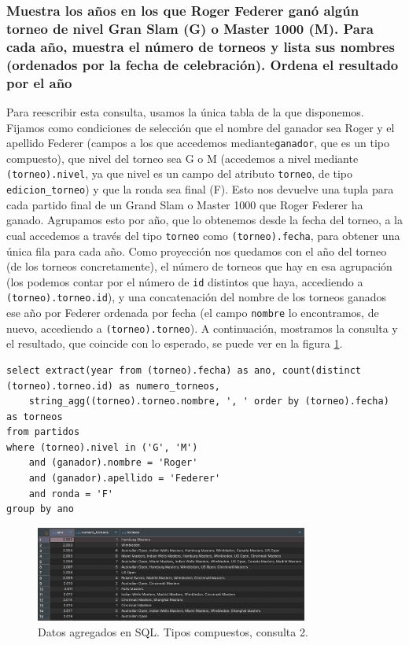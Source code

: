 \subsubsection{Muestra los años en los que Roger Federer ganó algún torneo de nivel Gran Slam (G) o Master 1000 (M). Para cada año, muestra el número de torneos y lista sus nombres (ordenados por la fecha de celebración). Ordena el resultado por el año}

Para reescribir esta consulta, usamos la única tabla de la que disponemos. Fijamos como condiciones de selección que el nombre del ganador sea Roger y el apellido Federer (campos a los que accedemos mediante\texttt{ganador}, que es un tipo compuesto), que nivel del torneo sea G o M (accedemos a nivel mediante \texttt{(torneo).nivel}, ya que nivel es un campo del atributo \texttt{torneo}, de tipo \texttt{edicion\_torneo}) y que la ronda sea final (F). Esto nos devuelve una tupla para cada partido final de un Grand Slam o Master 1000 que Roger Federer ha ganado. Agrupamos esto por año, que lo obtenemos desde la fecha del torneo, a la cual accedemos a través del tipo \texttt{torneo} como \texttt{(torneo).fecha}, para obtener una única fila para cada año. Como proyección nos quedamos con el año del torneo (de los torneos concretamente), el número de torneos que hay en esa agrupación (los podemos contar por el número de \texttt{id} distintos que haya, accediendo a \texttt{(torneo).torneo.id}), y una concatenación del nombre de los torneos ganados ese año por Federer ordenada por fecha (el campo \texttt{nombre} lo encontramos, de nuevo, accediendo a \texttt{(torneo).torneo}). A continuación, mostramos la consulta y el resultado, que coincide con lo esperado, se puede ver en la figura \ref{fig:q2_com}.

\begin{verbatim}
select extract(year from (torneo).fecha) as ano, count(distinct (torneo).torneo.id) as numero_torneos, 
	string_agg((torneo).torneo.nombre, ', ' order by (torneo).fecha) as torneos
from partidos
where (torneo).nivel in ('G', 'M')
	and (ganador).nombre = 'Roger'
	and (ganador).apellido = 'Federer'
	and ronda = 'F'
group by ano
\end{verbatim}

\begin{figure}[H]
\centering
\includegraphics[width=0.8\textwidth]{fotos/q2_com.png}
\caption{Datos agregados en SQL. Tipos compuestos, consulta 2.}
\label{fig:q2_com}
\end{figure}





